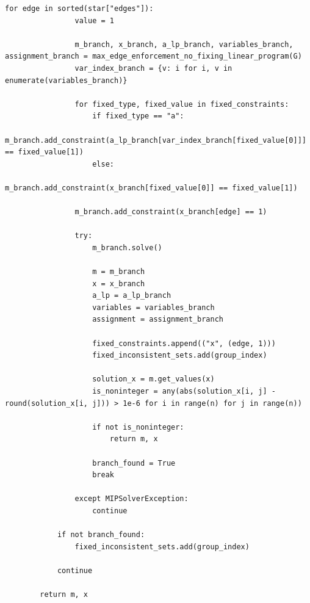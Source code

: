 \begin{lstlisting}[style=python, caption={Max Edge Enforcment Linear Program.}, label={lst::max_edge_enforcement_linear_program}]
            for edge in sorted(star["edges"]):
                value = 1

                m_branch, x_branch, a_lp_branch, variables_branch, assignment_branch = max_edge_enforcement_no_fixing_linear_program(G)
                var_index_branch = {v: i for i, v in enumerate(variables_branch)}

                for fixed_type, fixed_value in fixed_constraints:
                    if fixed_type == "a":
                        m_branch.add_constraint(a_lp_branch[var_index_branch[fixed_value[0]]] == fixed_value[1])
                    else:
                        m_branch.add_constraint(x_branch[fixed_value[0]] == fixed_value[1])

                m_branch.add_constraint(x_branch[edge] == 1)

                try:
                    m_branch.solve()

                    m = m_branch
                    x = x_branch
                    a_lp = a_lp_branch
                    variables = variables_branch
                    assignment = assignment_branch

                    fixed_constraints.append(("x", (edge, 1)))
                    fixed_inconsistent_sets.add(group_index)

                    solution_x = m.get_values(x)
                    is_noninteger = any(abs(solution_x[i, j] - round(solution_x[i, j])) > 1e-6 for i in range(n) for j in range(n))

                    if not is_noninteger:
                        return m, x

                    branch_found = True
                    break

                except MIPSolverException:
                    continue

            if not branch_found:
                fixed_inconsistent_sets.add(group_index)

            continue

        return m, x
\end{lstlisting}

